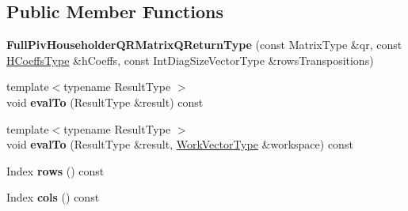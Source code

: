 \subsection*{Public Member Functions}
\begin{DoxyCompactItemize}
\item 
\mbox{\label{struct_eigen_1_1internal_1_1_full_piv_householder_q_r_matrix_q_return_type_a37a27f976a5e2b582e6e02e7c409afc9}} 
{\bfseries Full\+Piv\+Householder\+Q\+R\+Matrix\+Q\+Return\+Type} (const Matrix\+Type \&qr, const \mbox{\hyperlink{struct_eigen_1_1internal_1_1true__type}{H\+Coeffs\+Type}} \&h\+Coeffs, const Int\+Diag\+Size\+Vector\+Type \&rows\+Transpositions)
\item 
\mbox{\label{struct_eigen_1_1internal_1_1_full_piv_householder_q_r_matrix_q_return_type_a6d2495b5c87313fe23aa1ab32524d359}} 
{\footnotesize template$<$typename Result\+Type $>$ }\\void {\bfseries eval\+To} (Result\+Type \&result) const
\item 
\mbox{\label{struct_eigen_1_1internal_1_1_full_piv_householder_q_r_matrix_q_return_type_aeca3ef83807e4dd6b4fdc73ac20dc000}} 
{\footnotesize template$<$typename Result\+Type $>$ }\\void {\bfseries eval\+To} (Result\+Type \&result, \mbox{\hyperlink{class_eigen_1_1_matrix}{Work\+Vector\+Type}} \&workspace) const
\item 
\mbox{\label{struct_eigen_1_1internal_1_1_full_piv_householder_q_r_matrix_q_return_type_a33656ee221422a3800edf363c72994d4}} 
Index {\bfseries rows} () const
\item 
\mbox{\label{struct_eigen_1_1internal_1_1_full_piv_householder_q_r_matrix_q_return_type_ada880345139442a6e5a51ccd4dd2bf09}} 
Index {\bfseries cols} () const
\end{DoxyCompactItemize}
